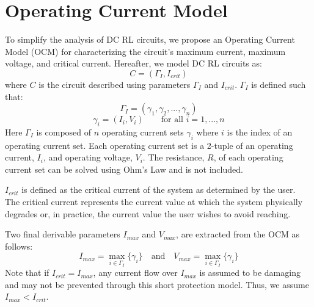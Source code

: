 \documentclass[11pt,oneside]{report}
\begin{document}
    \section*{Operating Current Model}
    To simplify the analysis of DC RL circuits, we propose an Operating Current Model (OCM) for characterizing the circuit's maximum current, maximum voltage, and critical current. Hereafter, we model DC RL circuits as:
    \begin{equation}\label{eq:OCM}
    C = (\Gamma_{I}, I_{crit})
    \end{equation}
    where $C$ is the circuit described using parameters $\Gamma_{I}$ and $I_{crit}$. $\Gamma_{I}$ is defined such that:
    \begin{equation}\label{eq:OCMTuples}
    \Gamma_{I} = (\gamma_{1},\gamma_{2},...,\gamma_{n})
    \end{equation}
    \begin{equation}\label{eq:OCMIVPairs}
    \gamma_{i} = (I_{i},V_{i})\qquad\text{for all  } i=1,...,n
    \end{equation}
    Here $\Gamma_{I}$ is composed of $n$ operating current sets $\gamma_{i}$ where $i$ is the index of an operating current set. Each operating current set is a 2-tuple of an operating current, $I_{i}$, and operating voltage, $V_{i}$. The resistance, $R$, of each operating current set can be solved using Ohm's Law and is not included. 
    
    $I_{crit}$ is defined as the critical current of the system as determined by the user. The critical current represents the current value at which the system physically degrades or, in practice, the current value the user wishes to avoid reaching.
    
    Two final derivable parameters $I_{max}$ and $V_{max}$, are extracted from the OCM as follows:
    \begin{equation}\label{eq:Imax}
    I_{max} = \max_{i \in \Gamma_{I}} \{\gamma_i\} \quad \text{and} \quad V_{max} = \max_{i \in \Gamma_{I}} \{\gamma_i\}
    \end{equation}
    Note that if $I_{crit} = I_{max}$, any current flow over $I_{max}$ is assumed to be damaging and may not be prevented through this short protection model. Thus, we assume $I_{max} < I_{crit}$.
\end{document}
